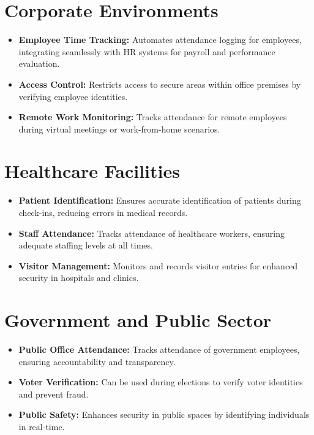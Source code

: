 \documentclass[openany]{report}
\begin{document}
\section{Corporate Environments}
\begin{itemize}
    \item \textbf{Employee Time Tracking:} Automates attendance logging for employees, integrating seamlessly with HR systems for payroll and performance evaluation.
    \item \textbf{Access Control:} Restricts access to secure areas within office premises by verifying employee identities.
    \item \textbf{Remote Work Monitoring:} Tracks attendance for remote employees during virtual meetings or work-from-home scenarios.
\end{itemize}

\section{Healthcare Facilities}
\begin{itemize}
    \item \textbf{Patient Identification:} Ensures accurate identification of patients during check-ins, reducing errors in medical records.
    \item \textbf{Staff Attendance:} Tracks attendance of healthcare workers, ensuring adequate staffing levels at all times.
    \item \textbf{Visitor Management:} Monitors and records visitor entries for enhanced security in hospitals and clinics.
\end{itemize}

\section{Government and Public Sector}
\begin{itemize}
    \item \textbf{Public Office Attendance:} Tracks attendance of government employees, ensuring accountability and transparency.
    \item \textbf{Voter Verification:} Can be used during elections to verify voter identities and prevent fraud.
    \item \textbf{Public Safety:} Enhances security in public spaces by identifying individuals in real-time.
\end{itemize}
\end{document}
